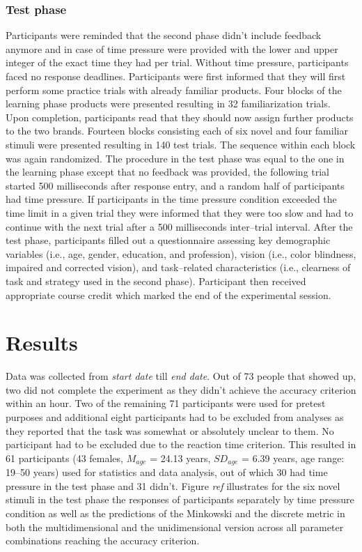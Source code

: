 \documentclass[a4paper,man,natbib]{apa6}
\begin{document}
\subsubsection{Test phase}
Participants were reminded that the second phase didn't include feedback anymore and in case of time pressure were provided with the lower and upper integer of the exact time they had per trial. Without time pressure, participants faced no response deadlines. Participants were first informed that they will first perform some practice trials with already familiar products. Four blocks of the learning phase products were presented resulting in 32 familiarization trials. Upon completion, participants read that they should now assign further products to the two brands. Fourteen blocks consisting each of six novel and four familiar stimuli were presented resulting in 140 test trials. The sequence within each block was again randomized. The procedure in the test phase was equal to the one in the learning phase except that no feedback was provided, the following trial started 500 milliseconds after response entry, and a random half of participants had time pressure. If participants in the time pressure condition exceeded the time limit in a given trial they were informed that they were too slow and had to continue with the next trial after a 500 milliseconds inter--trial interval. After the test phase, participants filled out a questionnaire assessing key demographic variables (i.e., age, gender, education, and profession), vision (i.e., color blindness, impaired and corrected vision), and task--related characteristics (i.e., clearness of task and strategy used in the second phase). Participant then received appropriate course credit which marked the end of the experimental session.

\section{Results}
Data was collected from \textit{start date} till \textit{end date}. Out of 73 people that showed up, two did not complete the experiment as they didn't achieve the accuracy criterion within an hour. Two of the remaining 71 participants were used for pretest purposes and additional eight participants had to be excluded from analyses as they reported that the task was somewhat or absolutely unclear to them. No participant had to be excluded due to the reaction time criterion. This resulted in 61 participants (43 females, $M_{age}$ = 24.13 years, $SD_{age}$ = 6.39 years, age range: 19--50 years) used for statistics and data analysis, out of which 30  had time pressure in the test phase and 31 didn't. Figure \textit{ref} illustrates for the six novel stimuli in the test phase the responses of participants separately by time pressure condition as well as the predictions of the Minkowski and the discrete metric in both the multidimensional and the unidimensional version across all parameter combinations reaching the accuracy criterion.
\end{document}

